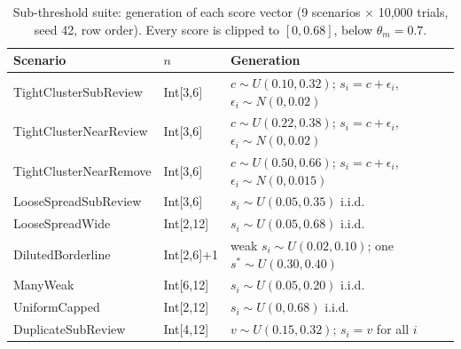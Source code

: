 \begin{table}[!t]
\caption{Sub-threshold suite: generation of each score vector (9 scenarios $\times$ 10,000 trials,
seed 42, row order). Every score is clipped to $[0,0.68]$, below $\theta_m=0.7$.}
\label{tab:mc-sub-spec}
\centering\footnotesize
\begin{tabular}{@{}llp{4.6cm}@{}}
\toprule
\textbf{Scenario} & \textbf{$n$} & \textbf{Generation} \\
\midrule
TightClusterSubReview & Int[3,6] & $c\sim U(0.10,0.32)$; $s_i=c+\epsilon_i$, $\epsilon_i\sim N(0,0.02)$ \\
TightClusterNearReview & Int[3,6] & $c\sim U(0.22,0.38)$; $s_i=c+\epsilon_i$, $\epsilon_i\sim N(0,0.02)$ \\
TightClusterNearRemove & Int[3,6] & $c\sim U(0.50,0.66)$; $s_i=c+\epsilon_i$, $\epsilon_i\sim N(0,0.015)$ \\
LooseSpreadSubReview & Int[3,6] & $s_i\sim U(0.05,0.35)$ i.i.d. \\
LooseSpreadWide & Int[2,12] & $s_i\sim U(0.05,0.68)$ i.i.d. \\
DilutedBorderline & Int[2,6]+1 & weak $s_i\sim U(0.02,0.10)$; one $s^*\sim U(0.30,0.40)$ \\
ManyWeak & Int[6,12] & $s_i\sim U(0.05,0.20)$ i.i.d. \\
UniformCapped & Int[2,12] & $s_i\sim U(0,0.68)$ i.i.d. \\
DuplicateSubReview & Int[4,12] & $v\sim U(0.15,0.32)$; $s_i=v$ for all $i$ \\
\bottomrule
\end{tabular}
\end{table}
